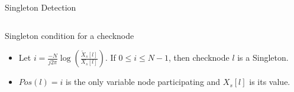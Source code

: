 \documentclass[10pt,xcolor=table]{beamer}
\begin{document}
\begin{frame}{Singleton Detection}
\begin{columns}
			\end{columns}
			\begin{block}{Singleton condition for a checknode}
			\begin{itemize}
				\item Let $i=\frac{-N}{j2\pi} \log(\frac{\tilde{X}_s[l]}{X_s[l]})$. If {\color{blue} $0 \leq i \leq N-1$}, then checknode $l$ is a \alert{Singleton}.\\
				\item $Pos(l) = i$ is the only variable node participating and $X_s[l]$ is its value.
			\end{itemize}
				
			\end{block}
			
	\end{frame}	

%
%
\end{document}
